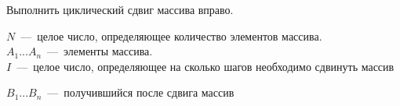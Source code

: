 Выполнить циклический сдвиг массива вправо.

\InputFile
\noindent
$N$~---~целое число, определяющее количество элементов массива.
\\
$A_1 ... A_n$~---~элементы массива. 
\\
$I$~---~целое число, определяющее на сколько шагов необходимо сдвинуть массив

\OutputFile
\noindent
$B_1 ... B_n$~---~получившийся после сдвига массив

\SAMPLES

